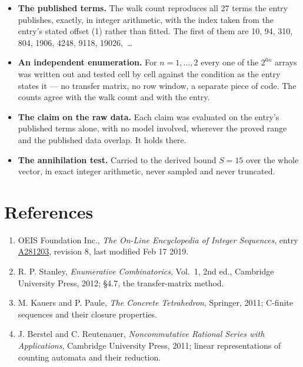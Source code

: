 \documentclass[11pt]{article}
\theoremstyle{definition}
\begin{document}
\begin{itemize}

\item {\bfseries The published terms.} The walk count reproduces all 27 terms the entry publishes, exactly, in integer arithmetic, with the index taken from the entry's stated offset (1) rather than fitted. The first of them are 10, 94, 310, 804, 1906, 4248, 9118, 19026,~\dots

\item {\bfseries An independent enumeration.} For $n = 1,\dots,2$ every one of the $2^{6n}$ arrays was written out and tested cell by cell against the condition as the entry states it --- no transfer matrix, no row window, a separate piece of code. The counts agree with the walk count and with the entry.

\item {\bfseries The claim on the raw data.} Each claim was evaluated on the entry's published terms alone, with no model involved, wherever the proved range and the published data overlap. It holds there.

\item {\bfseries The annihilation test.} Carried to the derived bound $S = 15$ over the whole vector, in exact integer arithmetic, never sampled and never truncated.

\end{itemize}

\section{References}

\begin{enumerate}

\item OEIS Foundation Inc., \emph{The On-Line Encyclopedia of Integer Sequences}, entry \href{https://oeis.org/A281203}{A281203}, revision 8, last modified Feb 17 2019.

\item R. P. Stanley, \emph{Enumerative Combinatorics}, Vol.~1, 2nd ed., Cambridge University Press, 2012; \S4.7, the transfer-matrix method.

\item M. Kauers and P. Paule, \emph{The Concrete Tetrahedron}, Springer, 2011; C-finite sequences and their closure properties.

\item J. Berstel and C. Reutenauer, \emph{Noncommutative Rational Series with Applications}, Cambridge University Press, 2011; linear representations of counting automata and their reduction.

\end{enumerate}
\end{document}
